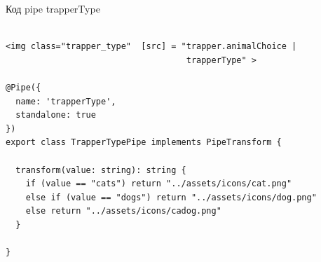 \begin{listing}
      \caption{Код pipe trapperType}
      \begin{verbatim}

<img class="trapper_type"  [src] = "trapper.animalChoice |
                                    trapperType" >

@Pipe({
  name: 'trapperType',
  standalone: true
})
export class TrapperTypePipe implements PipeTransform {

  transform(value: string): string {
    if (value == "cats") return "../assets/icons/cat.png"
    else if (value == "dogs") return "../assets/icons/dog.png"
    else return "../assets/icons/cadog.png"
  }

}
    \end{verbatim}
  \end{listing}





